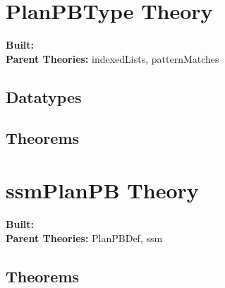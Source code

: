 \documentclass[11pt, twoside]{article}
\begin{document}




\tableofcontents
\cleardoublepage
\HOLpagestyle

\section{PlanPBType Theory}
\begin{flushleft}
\textbf{Built:} \HOLPlanPBTypeDate \\[2pt]
\textbf{Parent Theories:} indexedLists, patternMatches
\end{flushleft}

\subsection{Datatypes}

\HOLPlanPBTypeDatatypes


\subsection{Theorems}

\HOLPlanPBTypeTheorems

\section{ssmPlanPB Theory}
\begin{flushleft}
\textbf{Built:} \HOLssmPlanPBDate \\[2pt]
\textbf{Parent Theories:} PlanPBDef, ssm
\end{flushleft}



\subsection{Theorems}
\end{document}
